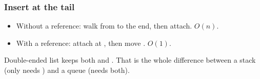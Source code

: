 \documentclass[aspectratio=169,10pt,compress]{beamer}
\begin{document}
\begin{frame}[t,fragile] \frametitle{Insert at the tail}
  \begin{itemize}\small
    \item Without a  reference: walk from  to
          the end, then attach. $O(n)$.
    \item With a  reference: attach at ,
          then move . $O(1)$.
  \end{itemize}
  \vspace{0.4em}
  \begin{block}{Double-ended list}
    \small
     keeps both  and .
    That is the whole difference between a stack (only needs
    ) and a queue (needs both).
  \end{block}
\end{frame}

\end{document}
